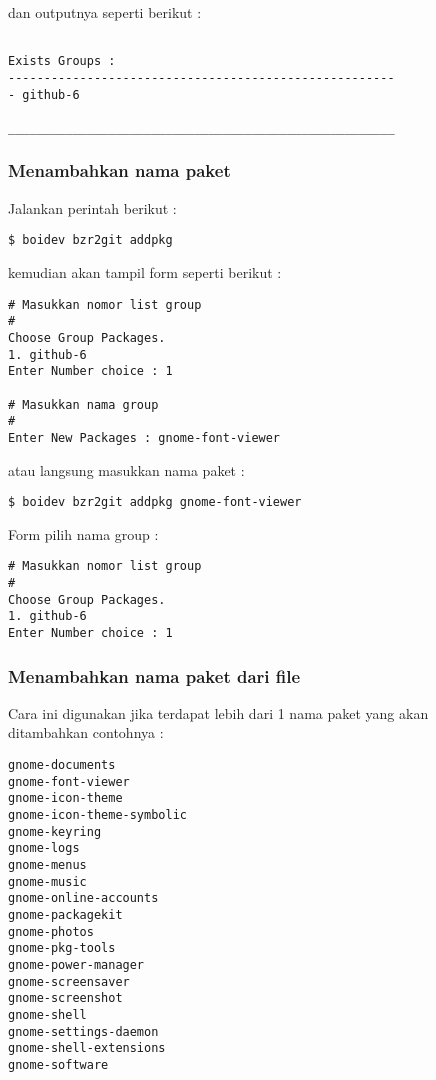 {\noindent
dan outputnya seperti berikut :

\begin{lstlisting}[language=ShellBash]

Exists Groups : 
------------------------------------------------------
- github-6

______________________________________________________
\end{lstlisting}

\subsubsection{Menambahkan nama paket}
\label{subsubsec:addpkg}
\noindent
Jalankan perintah berikut :

\begin{lstlisting}[language=ShellBash]
$ boidev bzr2git addpkg
\end{lstlisting}

\noindent
kemudian akan tampil form seperti berikut :

\begin{lstlisting}[language=ShellBash]
# Masukkan nomor list group
#
Choose Group Packages.
1. github-6
Enter Number choice : 1

# Masukkan nama group 
#
Enter New Packages : gnome-font-viewer
\end{lstlisting}

\noindent
atau langsung masukkan nama paket :

\begin{lstlisting}[language=ShellBash]
$ boidev bzr2git addpkg gnome-font-viewer
\end{lstlisting}

\noindent
Form pilih nama group :

\begin{lstlisting}[language=ShellBash]
# Masukkan nomor list group
#
Choose Group Packages.
1. github-6
Enter Number choice : 1
\end{lstlisting}

\subsubsection{Menambahkan nama paket dari file}
\label{subsubsec:addpkg-file}
\noindent
Cara ini digunakan jika terdapat lebih dari 1 nama paket yang akan ditambahkan contohnya :

\begin{lstlisting}[language=ShellBash]
gnome-documents
gnome-font-viewer
gnome-icon-theme
gnome-icon-theme-symbolic
gnome-keyring
gnome-logs
gnome-menus
gnome-music
gnome-online-accounts
gnome-packagekit
gnome-photos
gnome-pkg-tools
gnome-power-manager
gnome-screensaver
gnome-screenshot
gnome-shell
gnome-settings-daemon
gnome-shell-extensions
gnome-software
\end{lstlisting}

}
